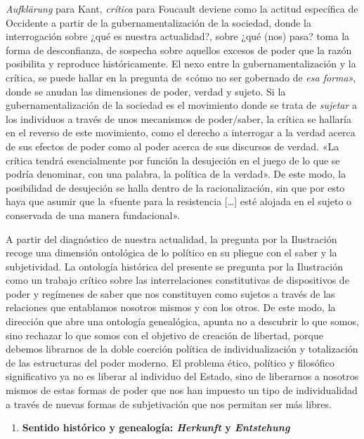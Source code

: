 \emph{Aufklärung} para Kant, \emph{crítica} para Foucault deviene como la actitud específica de Occidente a partir de la gubernamentalización de la sociedad, donde la interrogación sobre ¿qué es nuestra actualidad?, sobre ¿qué (nos) pasa? toma la forma de desconfianza, de sospecha sobre aquellos excesos de poder que la razón posibilita y reproduce históricamente. El nexo entre la gubernamentalización y la crítica, se puede hallar en la pregunta de «cómo no ser gobernado de \emph{esa forma}», donde se anudan las dimensiones de poder, verdad y sujeto. Si la gubernamentalización de la sociedad es el movimiento donde se trata de \emph{sujetar} a los individuos a través de unos mecanismos de poder/saber, la crítica se hallaría en el reverso de este movimiento, como el derecho a interrogar a la verdad acerca de sus efectos de poder como al poder acerca de sus discursos de verdad. «La crítica tendrá esencialmente por función la desujeción en el juego de lo que se podría denominar, con una palabra, la política de la verdad». De este modo, la posibilidad de desujeción se halla dentro de la racionalización, sin que por esto haya que asumir que la «fuente para la resistencia {[}\ldots{]} esté alojada en el sujeto o conservada de una manera fundacional».

A partir del diagnóstico de nuestra actualidad, la pregunta por la Ilustración recoge una dimensión ontológica de lo político en su pliegue con el saber y la subjetividad. La ontología histórica del presente se pregunta por la Ilustración como un trabajo crítico sobre las interrelaciones constitutivas de dispositivos de poder y regímenes de saber que nos constituyen como sujetos a través de las relaciones que entablamos nosotros mismos y con los otros. De este modo, la dirección que abre una ontología genealógica, apunta no a descubrir lo que somos, sino rechazar lo que somos con el objetivo de creación de libertad, porque debemos librarnos de la doble coerción política de individualización y totalización de las estructuras del poder moderno. El problema ético, político y filosófico significativo ya no es liberar al individuo del Estado, sino de liberarnos a nosotros mismos de estas formas de poder que nos han impuesto un tipo de individualidad a través de nuevas formas de subjetivación que nos permitan ser más libres.

\begin{enumerate}
\def\labelenumi{\arabic{enumi}.}
\item
  \textbf{Sentido histórico y genealogía: \emph{Herkunft }y \emph{Entstehung}}
\end{enumerate}

